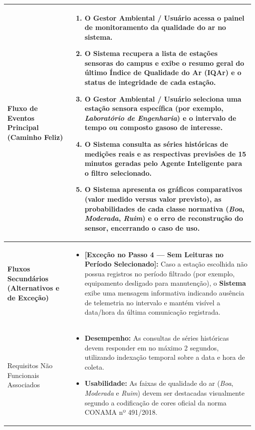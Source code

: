 \documentclass[11pt, a4paper]{article}
\begin{document}
\begin{longtable}{|>{\bfseries}p{3.8cm}|p{12.2cm}|}
Fluxo de Eventos Principal (Caminho Feliz) & 
\begin{enumerate}[nosep, leftmargin=0.5cm]
    \item O Gestor Ambiental / Usuário acessa o painel de monitoramento da qualidade do ar no sistema.
    \item O Sistema recupera a lista de estações sensoras do campus e exibe o resumo geral do último Índice de Qualidade do Ar (IQAr) e o status de integridade de cada estação.
    \item O Gestor Ambiental / Usuário seleciona uma estação sensora específica (por exemplo, \emph{Laboratório de Engenharia}) e o intervalo de tempo ou composto gasoso de interesse.
    \item O Sistema consulta as séries históricas de medições reais e as respectivas previsões de 15 minutos geradas pelo Agente Inteligente para o filtro selecionado.
    \item O Sistema apresenta os gráficos comparativos (valor medido versus valor previsto), as probabilidades de cada classe normativa (\emph{Boa}, \emph{Moderada}, \emph{Ruim}) e o erro de reconstrução do sensor, encerrando o caso de uso.
\end{enumerate} \\ \hline

Fluxos Secundários (Alternativos e de Exceção) & 
\begin{itemize}[nosep, leftmargin=0.5cm]
    \item \textbf{[Exceção no Passo 4 --- Sem Leituras no Período Selecionado]:} Caso a estação escolhida não possua registros no período filtrado (por exemplo, equipamento desligado para manutenção), o \textbf{Sistema} exibe uma mensagem informativa indicando ausência de telemetria no intervalo e mantém visível a data/hora da última comunicação registrada.
\end{itemize} \\ \hline

Requisitos Não Funcionais Associados & 
\begin{itemize}[nosep, leftmargin=0.5cm]
    \item \textbf{Desempenho:} As consultas de séries históricas devem responder em no máximo 2 segundos, utilizando indexação temporal sobre a data e hora de coleta.
    \item \textbf{Usabilidade:} As faixas de qualidade do ar (\emph{Boa}, \emph{Moderada} e \emph{Ruim}) devem ser destacadas visualmente segundo a codificação de cores oficial da norma CONAMA nº 491/2018.
\end{itemize} \\ \hline
\end{longtable}
\end{document}
